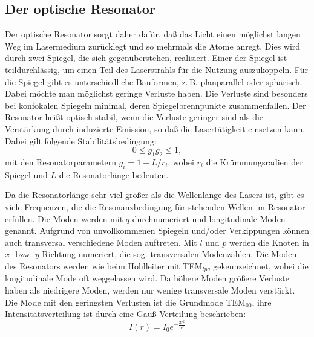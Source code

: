 \subsection{Der optische Resonator}
Der optische Resonator sorgt daher dafür, daß das Licht einen möglichst
langen Weg im Lasermedium zurücklegt und so mehrmals die Atome anregt.
Dies wird durch zwei Spiegel, die sich gegenüberstehen, realisiert.
Einer der Spiegel ist teildurchlässig, um einen Teil des Laserstrahls
für die Nutzung auszukoppeln.  Für die Spiegel gibt es unterschiedliche
Bauformen, z.\,B. planparallel oder sphärisch.  Dabei möchte man
möglichst geringe Verluste haben. Die Verluste sind besonders bei
konfokalen Spiegeln minimal, deren Spiegelbrennpunkte zusammenfallen.
Der Resonator heißt optisch stabil, wenn die Verluste geringer sind als
die Verstärkung durch induzierte Emission, so daß die Lasertätigkeit
einsetzen kann.  Dabei gilt folgende Stabilitätsbedingung:
\begin{equation}
  0 \le g_1 g_2 \le 1,
\end{equation}
mit den Resonatorparametern $g_i = 1 - L/r_i$, wobei $r_i$ die
Krümmungsradien der Spiegel und $L$ die Resonatorlänge bedeuten.

Da die Resonatorlänge sehr viel größer als die Wellenlänge des Lasers ist,
gibt es viele Frequenzen, die die Resonanzbedingung für stehenden Wellen
im Resonator erfüllen.  Die Moden werden mit $q$ durchnumeriert und
longitudinale Moden genannt.  Aufgrund von unvollkommenen Spiegeln
und/oder Verkippungen können auch transversal verschiedene Moden
auftreten. Mit $l$ und $p$ werden die Knoten in $x$- bzw. $y$-Richtung
numeriert, die sog. transversalen Modenzahlen.  Die Moden des Resonators
werden wie beim Hohlleiter mit TEM$_{lpq}$ gekennzeichnet, wobei die
longitudinale Mode oft weggelassen wird.  Da höhere Moden größere
Verluste haben als niedrigere Moden, werden nur wenige transversale
Moden verstärkt.  Die Mode mit den geringsten Verlusten ist die
Grundmode TEM$_{00}$, ihre Intensitätsverteilung ist durch eine
Gauß-Verteilung beschrieben:
\begin{equation}
  I(r) = I_0 e^{-\frac{2r^2}{w^2}}
\end{equation}
\FloatBarrier